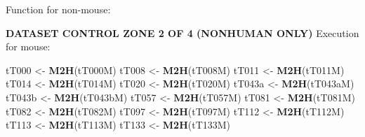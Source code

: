 \documentclass[
]{article}
\newenvironment{Shaded}{\begin{snugshade}}{\end{snugshade}}
\newcommand{\ControlFlowTok}[1]{\textcolor[rgb]{0.13,0.29,0.53}{\textbf{#1}}}
\newcommand{\DataTypeTok}[1]{\textcolor[rgb]{0.13,0.29,0.53}{#1}}
\newcommand{\DecValTok}[1]{\textcolor[rgb]{0.00,0.00,0.81}{#1}}
\newcommand{\KeywordTok}[1]{\textcolor[rgb]{0.13,0.29,0.53}{\textbf{#1}}}
\newcommand{\NormalTok}[1]{#1}
\newcommand{\OperatorTok}[1]{\textcolor[rgb]{0.81,0.36,0.00}{\textbf{#1}}}
\newcommand{\StringTok}[1]{\textcolor[rgb]{0.31,0.60,0.02}{#1}}
\begin{document}
Function for non-mouse:

\begin{Shaded}
\end{Shaded}

\textbf{DATASET CONTROL ZONE 2 OF 4 (NONHUMAN ONLY)} Execution for
mouse:

\begin{Shaded}
\begin{Highlighting}[]
\NormalTok{tT000 <-}\StringTok{ }\KeywordTok{M2H}\NormalTok{(tT000M)}
\NormalTok{tT008 <-}\StringTok{ }\KeywordTok{M2H}\NormalTok{(tT008M)}
\NormalTok{tT011 <-}\StringTok{ }\KeywordTok{M2H}\NormalTok{(tT011M)}
\NormalTok{tT014 <-}\StringTok{ }\KeywordTok{M2H}\NormalTok{(tT014M)}
\NormalTok{tT020 <-}\StringTok{ }\KeywordTok{M2H}\NormalTok{(tT020M)}
\NormalTok{tT043a <-}\StringTok{ }\KeywordTok{M2H}\NormalTok{(tT043aM)}
\NormalTok{tT043b <-}\StringTok{ }\KeywordTok{M2H}\NormalTok{(tT043bM)}
\NormalTok{tT057 <-}\StringTok{ }\KeywordTok{M2H}\NormalTok{(tT057M)}
\NormalTok{tT081 <-}\StringTok{ }\KeywordTok{M2H}\NormalTok{(tT081M)}
\NormalTok{tT082 <-}\StringTok{ }\KeywordTok{M2H}\NormalTok{(tT082M)}
\NormalTok{tT097 <-}\StringTok{ }\KeywordTok{M2H}\NormalTok{(tT097M)}
\NormalTok{tT112 <-}\StringTok{ }\KeywordTok{M2H}\NormalTok{(tT112M)}
\NormalTok{tT113 <-}\StringTok{ }\KeywordTok{M2H}\NormalTok{(tT113M)}
\NormalTok{tT133 <-}\StringTok{ }\KeywordTok{M2H}\NormalTok{(tT133M)}
\end{Highlighting}
\end{Shaded}
\end{document}
